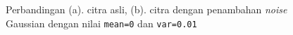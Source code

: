 \begin{figure}[h!]
\begin{center}
\caption{Perbandingan (a). citra asli, (b). citra dengan penambahan \textit{noise} Gaussian dengan nilai \texttt{mean=0} dan \texttt{var=0.01}}
\label{fig:addNoise}
\end{center}
\end{figure}


